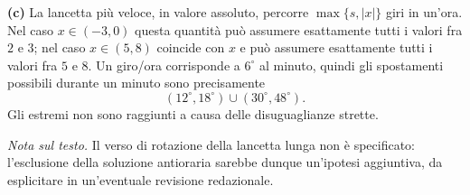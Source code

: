 {\textbf{(c)} La lancetta pi\`u veloce, in valore assoluto,
percorre $\max\{s,|x|\}$ giri in un'ora. Nel caso $x\in(-3,0)$
questa quantit\`a pu\`o assumere esattamente tutti i valori
fra $2$ e $3$; nel caso $x\in(5,8)$ coincide con $x$
e pu\`o assumere esattamente tutti i valori fra $5$ e $8$.
Un giro/ora corrisponde a $6^\circ$ al minuto, quindi gli spostamenti
possibili durante un minuto sono precisamente
\[
 (12^\circ,18^\circ)\cup(30^\circ,48^\circ).
\]
Gli estremi non sono raggiunti a causa delle disuguaglianze strette.

\textit{Nota sul testo.} Il verso di rotazione della lancetta lunga
non \`e specificato: l'esclusione della soluzione antioraria
sarebbe dunque un'ipotesi aggiuntiva, da esplicitare
in un'eventuale revisione redazionale.
}
\renewcommand{\SoluzioniAlternative}{}
\renewcommand{\Osservazioni}{}
\renewcommand{\Commenti}{}
